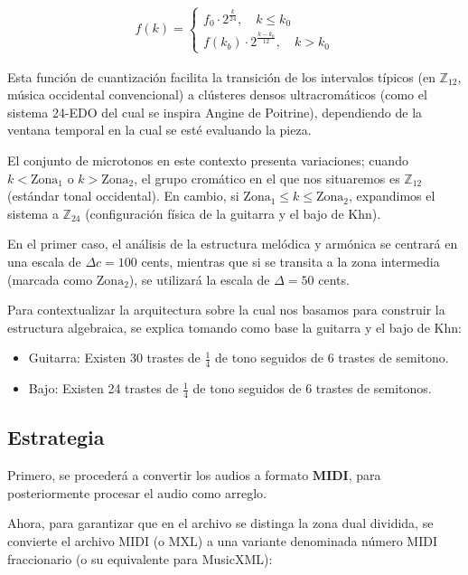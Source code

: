 \documentclass[11pt, a4paper]{article}
\begin{document}
\begin{align*}
f(k) =
\begin{cases}
f_0 \cdot 2^{\frac{k}{24}}, \quad k \leq k_0 \\
f(k_b) \cdot 2^{\frac{k-k_0}{12}}, \quad k > k_0
\end{cases}
\end{align*}

Esta función de cuantización facilita la transición de los intervalos típicos (en $\mathbb{Z}_{12}$, música occidental convencional) a clústeres densos ultracromáticos (como el sistema 24-EDO del cual se inspira Angine de Poitrine), dependiendo de la ventana temporal en la cual se esté evaluando la pieza.

El conjunto de microtonos en este contexto presenta variaciones; cuando $k < \text{Zona}_1$ o $k > \text{Zona}_2$, el grupo cromático en el que nos situaremos es $\mathbb{Z}_{12}$ (estándar tonal occidental). En cambio, si $\text{Zona}_1 \leq k \leq \text{Zona}_2$, expandimos el sistema a $\mathbb{Z}_{24}$ (configuración física de la guitarra y el bajo de Khn).

En el primer caso, el análisis de la estructura melódica y armónica se centrará en una escala de $\Delta c = 100$ cents, mientras que si se transita a la zona intermedia (marcada como $\text{Zona}_2$), se utilizará la escala de $\Delta = 50$ cents.

Para contextualizar la arquitectura sobre la cual nos basamos para construir la estructura algebraica, se explica tomando como base la guitarra y el bajo de Khn:

\begin{itemize}
    \item Guitarra: Existen 30 trastes de $\frac{1}{4}$ de tono seguidos de 6 trastes de semitono.
    \item Bajo: Existen 24 trastes de $\frac{1}{4}$ de tono seguidos de 6 trastes de semitonos.
\end{itemize}

\subsection*{Estrategia}

Primero, se procederá a convertir los audios a formato $\textbf{MIDI}$, para posteriormente procesar el audio como arreglo.

Ahora, para garantizar que en el archivo se distinga la zona dual dividida, se convierte el archivo MIDI (o MXL) a una variante denominada número MIDI fraccionario (o su equivalente para MusicXML):
\end{document}
